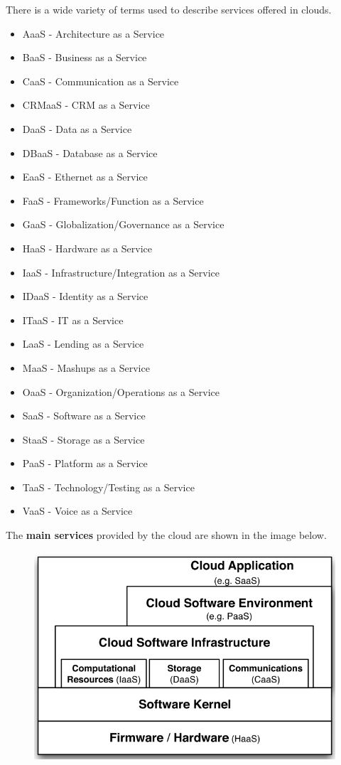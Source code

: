 There is a wide variety of  terms used to describe services offered in clouds.

\begin{multicols}{2}
	\begin{itemize}
		\item AaaS - Architecture as a Service
		\item BaaS - Business as a Service
		\item CaaS - Communication as a Service
		\item CRMaaS - CRM as a Service
		\item DaaS - Data as a Service
		\item DBaaS - Database as a Service
		\item EaaS - Ethernet as a Service
		\item FaaS - Frameworks/Function as a Service
		\item GaaS - Globalization/Governance as a Service
		\item HaaS - Hardware as a Service
		\item IaaS - Infrastructure/Integration as a Service
		\item IDaaS - Identity as a Service
		\item ITaaS - IT as a Service
		\item LaaS - Lending as a Service
		\item MaaS - Mashups as a Service
		\item OaaS - Organization/Operations as a Service
		\item SaaS - Software as a Service
		\item StaaS - Storage as a Service
		\item PaaS - Platform as a Service
		\item TaaS - Technology/Testing as a Service
		\item VaaS - Voice as a Service
	\end{itemize}
\end{multicols}

\newpage

\noindent
The \textbf{main services} provided by the cloud are shown in the image below.

\begin{figure}[!htp]
	\centering
	\includegraphics[width=.8\textwidth]{img/as-a-service-1.png}
\end{figure}

